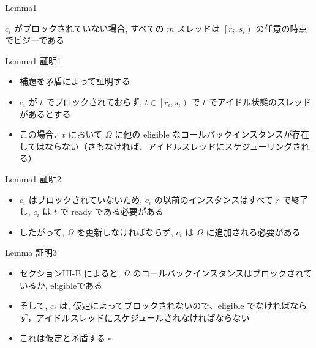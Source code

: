 \begin{frame}{Lemma1}
    \begin{lemma}[]
        $c_{i}$ がブロックされていない場合, すべての $m$ スレッドは $\left[r_{i}, s_{i}\right)$ の任意の時点でビジーである
    \end{lemma}
\end{frame}





\begin{frame}{Lemma1 証明1}
    \begin{itemize}
        \item 補題を矛盾によって証明する
        \item $c_{i}$ が $t$ でブロックされておらず, $t \in\left[r_{i}, s_{i}\right)$ で $t$ でアイドル状態のスレッドがあるとする
        \item この場合、$t$ において $\Omega$ に他の eligible なコールバックインスタンスが存在してはならない（さもなければ、アイドルスレッドにスケジューリングされる）
    \end{itemize}

\end{frame}

\begin{frame}{Lemma1 証明2}
    \begin{itemize}
        \item $c_{i}$ はブロックされていないため, $c_{i}$ の以前のインスタンスはすべて $r$ で終了し, $c_{i}$ は $t$ で ready である必要がある
        \item したがって, $\Omega$ を更新しなければならず, $c_{i}$ は $\Omega$ に追加される必要がある

    \end{itemize}
\end{frame}

\begin{frame}{Lemma 証明3}
    \begin{itemize}
        \item セクションIII-B によると, $\Omega$ のコールバックインスタンスはブロックされているか, eligibleである
        \item そして, $c_{i}$ は, 仮定によってブロックされないので、eligible でなければならず，アイドルスレッドにスケジュールされなければならない
        \item これは仮定と矛盾する $\square$
    \end{itemize}
\end{frame}
